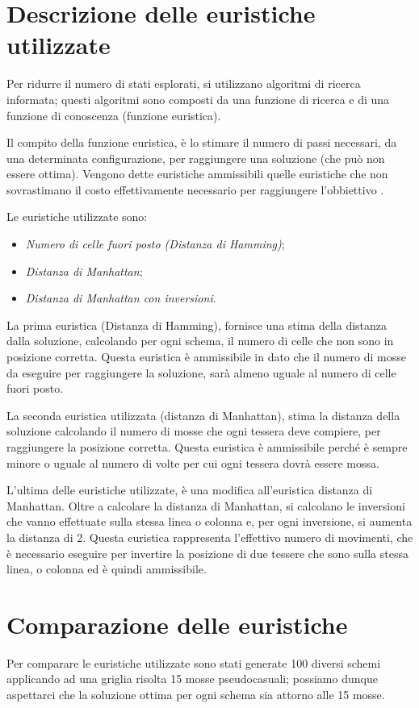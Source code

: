 \documentclass[letterpaper, 10 pt]{IEEEconf}
\begin{document}
\section{Descrizione delle euristiche utilizzate}
Per ridurre il numero di stati esplorati, si utilizzano algoritmi di ricerca informata; questi algoritmi sono composti da una funzione di ricerca e di una funzione di conoscenza (funzione euristica).\par
Il compito della funzione euristica, è lo stimare il numero di passi necessari, da una determinata configurazione, per raggiungere una soluzione (che può non essere ottima).
Vengono dette euristiche ammissibili quelle euristiche che non sovrastimano il costo effettivamente necessario per raggiungere l'obbiettivo \cite[p.~129]{russell2005intelligenza}.\par
Le euristiche utilizzate sono:
\begin{itemize}
\item \textit{Numero di celle fuori posto (Distanza di Hamming)};
\item \textit{Distanza di Manhattan};
\item \textit{Distanza di Manhattan con inversioni}.
\end{itemize}
La prima euristica (Distanza di Hamming), fornisce una stima della distanza dalla soluzione, calcolando per ogni schema, il numero di celle che non sono in posizione corretta. Questa euristica è ammissibile in dato che il numero di mosse da eseguire per raggiungere la soluzione, sarà almeno uguale al numero di celle fuori posto\cite{wikieurAmm}.\par
La seconda euristica utilizzata (distanza di Manhattan), stima la distanza della soluzione calcolando il numero di mosse che ogni tessera deve compiere, per raggiungere la posizione corretta.
Questa euristica è ammissibile perché è sempre minore o uguale al numero di volte per cui ogni tessera dovrà essere mossa\cite{wikieurAmm}.\par
L'ultima delle euristiche utilizzate, è una modifica all'euristica distanza di Manhattan. Oltre a calcolare la distanza di Manhattan, si calcolano le inversioni che vanno effettuate sulla stessa linea o colonna e, per ogni inversione, si aumenta la distanza di 2.
Questa euristica rappresenta l'effettivo numero di movimenti, che è necessario eseguire per invertire la posizione di due tessere che sono sulla stessa linea, o colonna  ed è quindi ammissibile.


\section{Comparazione delle euristiche}
Per comparare le euristiche utilizzate sono stati generate 100 diversi schemi applicando ad una griglia risolta 15 mosse pseudocasuali; possiamo dunque aspettarci che la soluzione ottima per ogni schema sia attorno alle 15 mosse.
\end{document}

